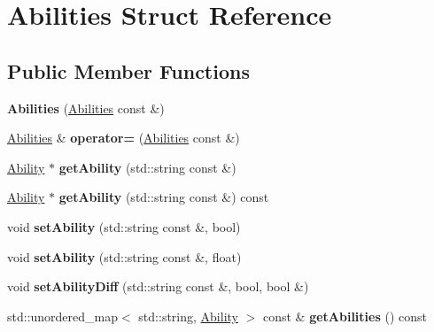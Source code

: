 \hypertarget{struct_abilities}{}\section{Abilities Struct Reference}
\label{struct_abilities}
\subsection*{Public Member Functions}
\begin{DoxyCompactItemize}
\item 
\mbox{\label{struct_abilities_aa931bdba431cf26909332a1cf2623a67}} 
{\bfseries Abilities} (\mbox{\hyperlink{struct_abilities}{Abilities}} const \&)
\item 
\mbox{\label{struct_abilities_a0c2af3d2deb7db5f23f54069629202eb}} 
\mbox{\hyperlink{struct_abilities}{Abilities}} \& {\bfseries operator=} (\mbox{\hyperlink{struct_abilities}{Abilities}} const \&)
\item 
\mbox{\label{struct_abilities_a7f3b3d3a7288edb274a5342eefcf24c8}} 
\mbox{\hyperlink{struct_ability}{Ability}} $\ast$ {\bfseries get\+Ability} (std\+::string const \&)
\item 
\mbox{\label{struct_abilities_a47e9a6f8659801dfbe2e57806db7f4fe}} 
\mbox{\hyperlink{struct_ability}{Ability}} $\ast$ {\bfseries get\+Ability} (std\+::string const \&) const
\item 
\mbox{\label{struct_abilities_a68b9039ef5396e0a26d2475693b4d4c5}} 
void {\bfseries set\+Ability} (std\+::string const \&, bool)
\item 
\mbox{\label{struct_abilities_a6e3791dd94683483e054269377b22679}} 
void {\bfseries set\+Ability} (std\+::string const \&, float)
\item 
\mbox{\label{struct_abilities_a5f93193eb0bab3ff85be2e29a35b5a84}} 
void {\bfseries set\+Ability\+Diff} (std\+::string const \&, bool, bool \&)
\item 
\mbox{\label{struct_abilities_a2933a51097b049b33f72afc5d1e952d2}} 
std\+::unordered\+\_\+map$<$ std\+::string, \mbox{\hyperlink{struct_ability}{Ability}} $>$ const  \& {\bfseries get\+Abilities} () const

\end{DoxyCompactItemize}
